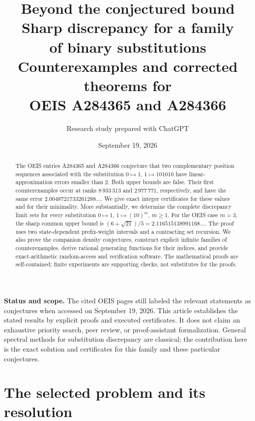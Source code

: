 \documentclass[11pt]{article}
\title{\color{ink}\LARGE Beyond the conjectured bound\\[5pt]
\Large Sharp discrepancy for a family\\of binary substitutions\\[9pt]
\large Counterexamples and corrected theorems for\\OEIS A284365 and A284366}
\author{Research study prepared with ChatGPT}
\date{September 19, 2026}
\numberwithin{equation}{section}
\theoremstyle{definition}
\theoremstyle{remark}
\begin{document}
\maketitle
\thispagestyle{empty}
\begin{abstract}
The OEIS entries A284365 and A284366 conjecture that two complementary
position sequences associated with the substitution $0\mapsto1$,
$1\mapsto101010$ have linear-approximation errors smaller than $2$.
Both upper bounds are false. Their first counterexamples occur at ranks
$8\,933\,313$ and $2\,977\,771$, respectively, and have the same error
$2.0048721733261288\ldots$. We give exact integer certificates for these
values and for their minimality. More substantially, we determine the
complete discrepancy limit sets for every substitution
$0\mapsto1$, $1\mapsto(10)^m$, $m\ge1$. For the OEIS case $m=3$, the sharp
common upper bound is $(6+\sqrt{21})/5=2.116515138991168\ldots$.
The proof uses two state-dependent prefix-weight intervals and a contracting
set recursion. We also prove the companion density conjectures, construct
explicit infinite families of counterexamples, derive rational generating
functions for their indices, and provide exact-arithmetic random-access
and verification software. The mathematical proofs are self-contained;
finite experiments are supporting checks, not substitutes for the proofs.
\end{abstract}

\begin{resultbox}
\textbf{Status and scope.} The cited OEIS pages still labeled the relevant
statements as conjectures when accessed on September 19, 2026.
This article establishes the stated results by explicit proofs and executed
certificates. It does not claim an exhaustive priority search, peer review,
or proof-assistant formalization. General spectral methods for substitution
discrepancy are classical; the contribution here is the exact solution and
certificates for this family and these particular conjectures.
\end{resultbox}

\clearpage
\tableofcontents
\clearpage

\section{The selected problem and its resolution}\label{sec:problem}
\end{document}
